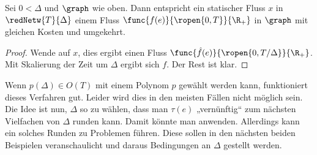 \begin{lemma}\label{lem:reduced_static_dyn_conv}
    Sei $0 < \Delta$ und $\graph$ wie oben. Dann entspricht ein statischer Fluss $x$
    in $\redNetw{T}{\Delta}$ einem Fluss $\func{f(e)}{\ropen{0, T}}{\R_+}$ in
    $\graph$ mit gleichen Kosten und umgekehrt.
    
    \begin{proof}
        Wende  auf $x$, dies ergibt einen Fluss
        $\func{\hat{f}(e)}{\ropen{0, T/\Delta}}{\R_+}$. Mit Skalierung der
        Zeit um $\Delta$ ergibt sich $f$. Der Rest ist klar.
    \end{proof}
\end{lemma}

Wenn $p(\Delta) \in O(T)$ mit einem Polynom $p$ gewählt werden kann, funktioniert
dieses Verfahren gut. Leider wird dies in den meisten Fällen nicht möglich sein.
Die Idee ist nun, $\Delta$ so zu wählen, dass man $\tau(e)$ „vernünftig“ zum
nächsten Vielfachen von $\Delta$ runden kann. Damit könnte man
 anwenden. Allerdings kann ein solches
Runden zu Problemen führen. Diese sollen in den nächsten beiden Beispielen
veranschaulicht und daraus Bedingungen an $\Delta$ gestellt werden.

